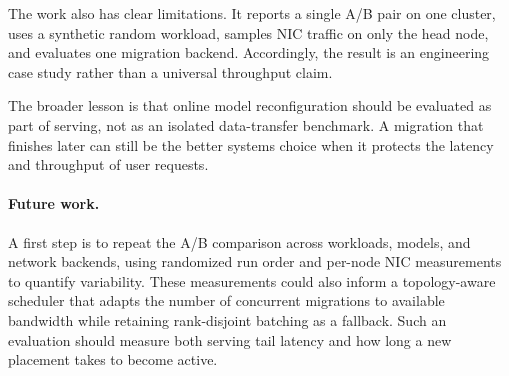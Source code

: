 The work also has clear limitations. It reports a single A/B pair on one
cluster, uses a synthetic random workload, samples NIC traffic on only the head
node, and evaluates one migration backend. Accordingly, the result is an
engineering case study rather than a universal throughput claim.

The broader lesson is that online model reconfiguration should be evaluated as
part of serving, not as an isolated data-transfer benchmark. A migration that
finishes later can still be the better systems choice when it protects the
latency and throughput of user requests.

\paragraph{Future work.}
A first step is to repeat the A/B comparison across workloads, models, and
network backends, using randomized run order and per-node NIC measurements
to quantify variability. These measurements could also inform a
topology-aware scheduler that adapts the number of concurrent migrations to
available bandwidth while retaining rank-disjoint batching as a fallback.
Such an evaluation should measure both serving tail latency and how long a
new placement takes to become active.
